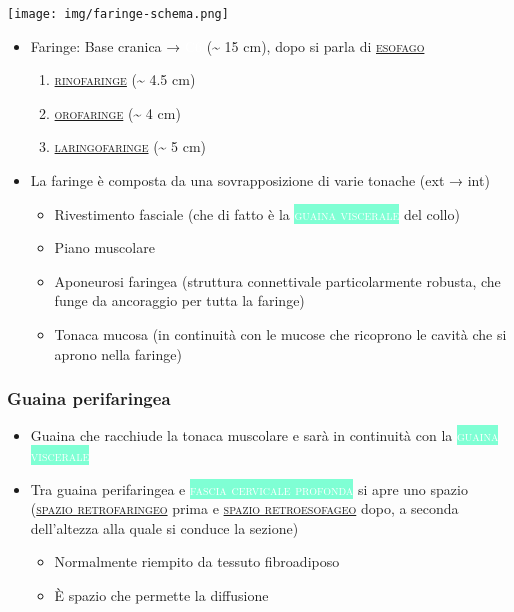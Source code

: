 \documentclass[italian,]{article}
\providecommand{\tightlist}{%
  \setlength{\itemsep}{0pt}\setlength{\parskip}{0pt}}
\newcommand{\oss}[1]{\colorbox{ossa}{\textcolor{white}{\textsc{#1}}}}
\newcommand{\tol}[1]{\colorbox{Aquamarine}{\textcolor{white}{\textsc{#1}}}}
\renewcommand{\a}[1]{\underline{\textsc{#1}}}
\begin{document}
\centering

\texttt{[image: img/faringe-schema.png]}~
\justify

\begin{itemize}
\tightlist
\item
  Faringe: Base cranica → \oss{C6} (\textasciitilde{} 15 cm), dopo si
  parla di \a{esofago}

  \begin{enumerate}
  \def\labelenumi{\arabic{enumi}.}
  \tightlist
  \item
    \a{rinofaringe} (\textasciitilde{} 4.5 cm)
  \item
    \a{orofaringe} (\textasciitilde{} 4 cm)
  \item
    \a{laringofaringe} (\textasciitilde{} 5 cm)
  \end{enumerate}
\item
  La faringe è composta da una sovrapposizione di varie tonache (ext →
  int)

  \begin{itemize}
  \tightlist
  \item
    Rivestimento fasciale (che di fatto è la \tol{guaina viscerale} del
    collo)
  \item
    Piano muscolare
  \item
    Aponeurosi faringea (struttura connettivale particolarmente robusta,
    che funge da ancoraggio per tutta la faringe)
  \item
    Tonaca mucosa (in continuità con le mucose che ricoprono le cavità
    che si aprono nella faringe)
  \end{itemize}
\end{itemize}

\hypertarget{guaina-perifaringea}{%
\subsubsection{Guaina perifaringea}\label{guaina-perifaringea}}

\begin{itemize}
\tightlist
\item
  Guaina che racchiude la tonaca muscolare e sarà in continuità con la
  \tol{guaina viscerale}
\item
  Tra guaina perifaringea e \tol{fascia cervicale profonda} si apre uno
  spazio (\a{spazio retrofaringeo} prima e \a{spazio retroesofageo}
  dopo, a seconda dell'altezza alla quale si conduce la sezione)

  \begin{itemize}
  \tightlist
  \item
    Normalmente riempito da tessuto fibroadiposo
  \item
    È spazio che permette la diffusione
  \end{itemize}
\end{itemize}
\end{document}
